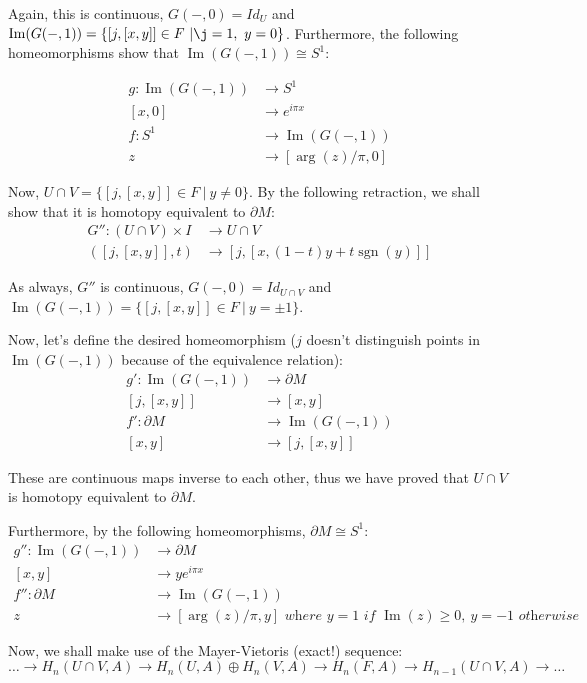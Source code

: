 \documentclass{article}
\DeclareMathOperator{\Ima}{Im}
\DeclareMathOperator{\sgn}{sgn}
\begin{document}
Again, this is continuous, $G(-,0)=Id_U$ and $\Ima(G(-,1))=\{[j,[x,y]]\in F\ |\j=1,\ y=0\}$. Furthermore, the following homeomorphisms show that $\Ima(G(-,1))\cong S^1$:

\begin{align*}
		g:\Ima(G(-,1)) & \rightarrow S^1 \\
		[x,0] & \rightarrow e^{i\pi x} \\
		f:S^1 & \rightarrow \Ima(G(-,1)) \\
		z & \rightarrow [\arg(z)/\pi,0]
\end{align*}

Now, $U\cap V=\{[j,[x,y]]\in F\ |\ y\neq 0\}$. By the following retraction, we shall show that it is homotopy equivalent to $\partial M$:
\begin{align*}
		G'':(U\cap V)\times I & \rightarrow U\cap V \\
		([j,[x,y]],t) & \rightarrow [j,[x,(1-t)y+t\sgn(y)]]
\end{align*}

As always, $G''$ is continuous, $G(-,0)=Id_{U\cap V}$ and $\Ima(G(-,1))=\{[j,[x,y]]\in F\ |\ y=\pm 1\}$.

Now, let's define the desired homeomorphism ($j$ doesn't distinguish points in $\Ima(G(-,1))$ because of the equivalence relation):
\begin{align*}
		g':\Ima(G(-,1)) & \rightarrow\partial M \\
		[j,[x,y]] & \rightarrow [x,y] \\
		f':\partial M & \rightarrow \Ima(G(-,1)) \\
		[x,y] & \rightarrow [j,[x,y]]
\end{align*}

These are continuous maps inverse to each other, thus we have proved that $U\cap V$ is homotopy equivalent to $\partial M$.

Furthermore, by the following homeomorphisms, $\partial M\cong S^1$:
\begin{align*}
		g'':\Ima(G(-,1)) & \rightarrow\partial M \\
		[x,y] & \rightarrow ye^{i\pi x} \\
		f'':\partial M & \rightarrow \Ima(G(-,1)) \\
		z & \rightarrow [\arg(z)/\pi,y]\textit{ where } y=1\textit{ if } \Ima(z)\geq 0,\ y=-1\textit{ otherwise}
\end{align*}

Now, we shall make use of the Mayer-Vietoris (exact!) sequence:
$$\ldots\rightarrow H_n(U\cap V,A)\rightarrow H_n(U,A)\oplus H_n(V,A)\rightarrow H_n(F,A)\rightarrow H_{n-1}(U\cap V,A)\rightarrow\ldots$$
\end{document}
